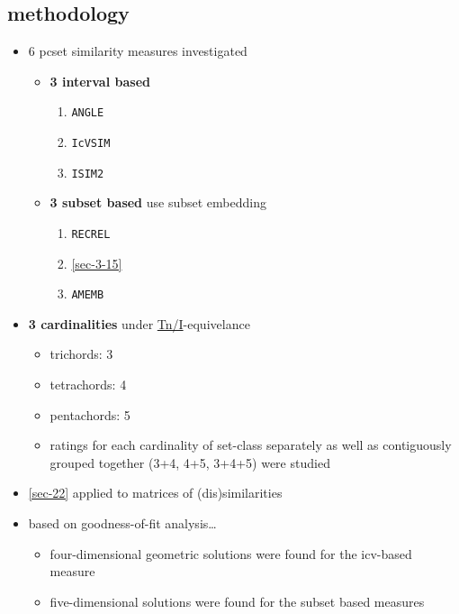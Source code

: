 \documentclass[11pt]{article}
\begin{document}
{{\subsection{methodology}
\label{sec-15-1}
\begin{itemize}
\item 6 pcset similarity measures investigated
\begin{itemize}
\item \textbf{3 interval based}
\begin{enumerate}
\item \texttt{ANGLE}
\item \texttt{IcVSIM}
\item \texttt{ISIM2}
\end{enumerate}
\item \textbf{3 subset based} use subset embedding
\begin{enumerate}
\item \texttt{RECREL}
\item \ref{sec-3-15}
\item \texttt{AMEMB}
\end{enumerate}
\end{itemize}
\item \textbf{3 cardinalities} under \hyperref[sec-21-7]{Tn/I}-equivelance
\begin{itemize}
\item trichords: 3
\item tetrachords: 4
\item pentachords: 5
\item ratings for each cardinality of set-class separately as well as
contiguously grouped together (3+4, 4+5, 3+4+5) were studied
\end{itemize}
\item \ref{sec-22} applied to matrices of (dis)similarities
\item based on goodness-of-fit analysis\ldots{}
\begin{itemize}
\item four-dimensional geometric solutions were found for the
icv-based measure
\item five-dimensional solutions were found for the subset based
measures
\end{itemize}
\end{itemize}

}}
\end{document}
